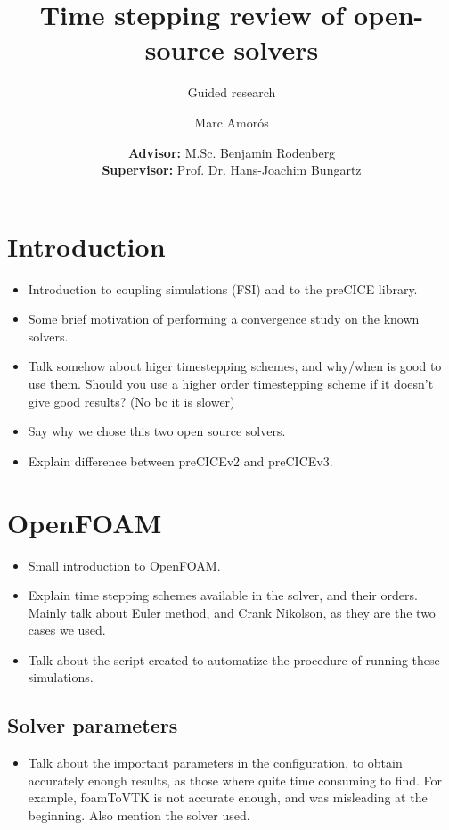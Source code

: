 \documentclass[
  english,        %
  font=times,     %
  onecolumn,      %
]{tumarticle}
\title{Time stepping review of open-source solvers}
\subtitle{Guided research}
\author[email=marc.amoros@tum.de]{Marc Amorós}
\date{
    \small
    \textbf{Advisor:} M.Sc. Benjamin Rodenberg \\
    \textbf{Supervisor:} Prof. Dr. Hans-Joachim Bungartz \\
}
\begin{document}
\maketitle


\section{Introduction}
\begin{itemize}
    \item Introduction to coupling simulations (FSI) and to the preCICE library. 
    \item Some brief motivation of performing a convergence study on the known solvers.
    \item Talk somehow about higer timestepping schemes, and why/when is good to use them. Should you use a higher order timestepping scheme if it doesn't give good results? (No bc it is slower) 
    \item Say why we chose this two open source solvers.
    \item Explain difference between preCICEv2 and preCICEv3.
\end{itemize}


\section{OpenFOAM}
\begin{itemize}
    \item Small introduction to OpenFOAM.
    \item Explain time stepping schemes available in the solver, and their orders. Mainly talk about Euler method, and Crank Nikolson, as they are the two cases we used.
    \item Talk about the script created to automatize the procedure of running these simulations. 
\end{itemize}

\subsection{Solver parameters}
\begin{itemize}
    \item Talk about the important parameters in the configuration, to obtain accurately enough results, as those where quite time consuming to find. For example, foamToVTK is not accurate enough, and was misleading at the beginning. Also mention the solver used.
\end{itemize}
\end{document}
